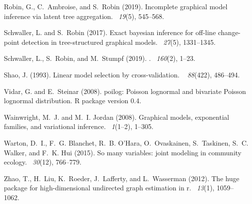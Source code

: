\documentclass{article}                     %
\begin{document}
\begin{thebibliography}{}
Robin, G., C.~Ambroise, and S.~Robin (2019).
\newblock Incomplete graphical model inference via latent tree aggregation.
~{\em 19\/}(5), 545--568.

Schwaller, L. and S.~Robin (2017).
\newblock Exact bayesian inference for off-line change-point detection in
  tree-structured graphical models.
~{\em 27\/}(5), 1331--1345.

{Schwaller}, L., S.~{Robin}, and M.~{Stumpf} (2019).
.
~{\em 160\/}(2), 1--23.

Shao, J. (1993).
\newblock Linear model selection by cross-validation.
~{\em
  88\/}(422), 486--494.

Vidar, G. and E.~Steinar (2008).
\newblock poilog: {P}oisson lognormal and bivariate {P}oisson lognormal
  distribution.
\newblock R package version 0.4.

Wainwright, M.~J. and M.~I. Jordan (2008).
\newblock Graphical models, exponential families, and variational inference.
~{\em 1\/}(1--2), 1--305.

Warton, D.~I., F.~G. Blanchet, R.~B. O'Hara, O.~Ovaskainen, S.~Taskinen, S.~C.
  Walker, and F.~K. Hui (2015).
\newblock So many variables: joint modeling in community ecology.
~{\em 30\/}(12), 766--779.

Zhao, T., H.~Liu, K.~Roeder, J.~Lafferty, and L.~Wasserman (2012).
\newblock The huge package for high-dimensional undirected graph estimation in
  r.
~{\em 13\/}(1),
  1059--1062.

\end{thebibliography}


\begin{appendix}

 \newpage

 \newpage

\end{appendix}
\end{document}
